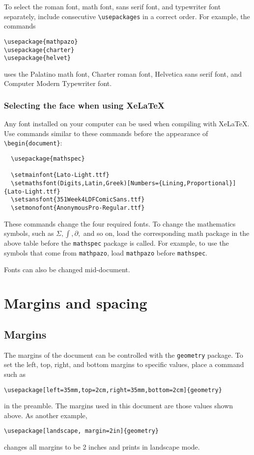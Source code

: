 \documentclass[11pt]{article}
\theoremstyle{definition}
\begin{document}
To select the roman font, math font, sans serif font, and typewriter font separately,
include consecutive \verb~\usepackages~ in a correct order.  For example, the commands
\begin{verbatim}
\usepackage{mathpazo}
\usepackage{charter}
\usepackage{helvet}
\end{verbatim}
uses the Palatino math font, Charter roman font, Helvetica sans serif font, and Computer
Modern Typewriter font.

\subsubsection{Selecting the face when using XeLaTeX}

Any font installed on your computer can be used when compiling with XeLaTeX.  Use commands
similar to these commands before the appearance of \verb~\begin{document}~:

\begin{verbatim}
  \usepackage{mathspec}

  \setmainfont{Lato-Light.ttf}
  \setmathsfont(Digits,Latin,Greek)[Numbers={Lining,Proportional}]{Lato-Light.ttf}
  \setsansfont{351Week4LDFComicSans.ttf}
  \setmonofont{AnonymousPro-Regular.ttf}
\end{verbatim}

These commands change the four required fonts.  To change the mathematics symbols, such
as \(\displaystyle \Sigma, \int, \partial,\) and so on, load the corresponding math package in the
above table before the \verb~mathspec~ package is called.  For example, to use the
symbols that come from \verb~mathpazo~, load \verb~mathpazo~ before \verb~mathspec~.

{\fontsize{4.5ex}{1ex} Fonts can also be changed
  mid-document.}

\section{Margins and spacing}

\subsection{Margins}

The margins of the document can be controlled with the \verb~geometry~ package.  To set
the left, top, right, and bottom margins to specific values, place a command such as
\begin{verbatim}
\usepackage[left=35mm,top=2cm,right=35mm,bottom=2cm]{geometry}
\end{verbatim}
in the preamble.  The margins used in this document are those values shown above.  As
another example,
\begin{verbatim}
\usepackage[landscape, margin=2in]{geometry}
\end{verbatim}
changes all margins to be 2 inches and prints in landscape mode.
\end{document}

